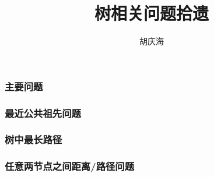 \documentclass{beamer}
\begin{document}
\begin{CJK}{UTF8}{gbsn}     %

	\title{树相关问题拾遗}
	\author{胡庆海}
	\date{}

    \begin{frame}
        \frametitle{主要问题}
    \end{frame}

	\begin{frame}
		\frametitle{最近公共祖先问题}
	\end{frame}

	\begin{frame}
		\frametitle{树中最长路径}
	\end{frame}

	\begin{frame}
		\frametitle{任意两节点之间距离/路径问题}
	\end{frame}

\end{CJK}
\end{document}
